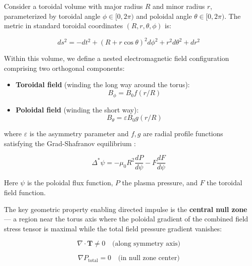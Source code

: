 \documentclass[12pt,a4paper]{article}
\begin{document}
Consider a toroidal volume with major radius $R$ and minor radius $r$, parameterized by toroidal angle $\phi \in [0, 2\pi)$ and poloidal angle $\theta \in [0, 2\pi)$. The metric in standard toroidal coordinates $(R, r, \theta, \phi)$ is:

\begin{equation}
ds^2 = -dt^2 + (R + r\cos\theta)^2 d\phi^2 + r^2 d\theta^2 + dr^2
\label{eq:metric}
\end{equation}

Within this volume, we define a nested electromagnetic field configuration comprising two orthogonal components:

\begin{itemize}
    \item \textbf{Toroidal field} (winding the long way around the torus):
    \begin{equation}
    B_\phi = B_0 f(r/R)
    \label{eq:Bphi}
    \end{equation}
    \item \textbf{Poloidal field} (winding the short way):
    \begin{equation}
    B_\theta = \varepsilon B_0 g(r/R)
    \label{eq:Btheta}
    \end{equation}
\end{itemize}

where $\varepsilon$ is the asymmetry parameter and $f,g$ are radial profile functions satisfying the Grad-Shafranov equilibrium \cite{grad1958,shafranov1966}:

\begin{equation}
\Delta^* \psi = -\mu_0 R^2 \frac{dP}{d\psi} - F\frac{dF}{d\psi}
\label{eq:gradshafranov}
\end{equation}

Here $\psi$ is the poloidal flux function, $P$ the plasma pressure, and $F$ the toroidal field function.

The key geometric property enabling directed impulse is the \textbf{central null zone} --- a region near the torus axis where the poloidal gradient of the combined field stress tensor is maximal while the total field pressure gradient vanishes:

\begin{equation}
\nabla \cdot \mathbf{T} \neq 0 \quad \text{(along symmetry axis)}
\label{eq:stress}
\end{equation}

\begin{equation}
\nabla P_{\text{total}} = 0 \quad \text{(in null zone center)}
\label{eq:pressure}
\end{equation}
\end{document}

